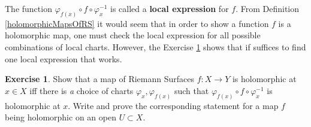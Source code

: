 \documentclass[12pt]{book}%
\theoremstyle{plain}
\theoremstyle{definition}
\newtheorem{exercise}{Exercise}
\theoremstyle{remark}
\def\to{\rightarrow}
\begin{document}
\begin{figure}
\label{schematicMapOfRS}
\end{figure}

The function $\varphi_{f(x)} \circ f \circ \varphi_x^{-1}$ is called a \textbf{local expression} for $f$. From Definition \ref{holomorphicMapsOfRS} it would seem that in order to show a function $f$ is a holomorphic map, one must check the local expression for all possible combinations of local charts. However, the Exercise \ref{oneLocalExpressionSuffices} shows that if suffices to find one local expression that works.

\begin{exercise}
\label{oneLocalExpressionSuffices}
Show that a map of Riemann Surfaces $f:X \to Y$ is holomorphic at $x\in X$ iff there is \textit{a} choice of charts $\varphi_x, \varphi_{f(x)}$ such that $\varphi_{f(x)} \circ f \circ \varphi_x^{-1}$ is holomorphic at $x$. Write and prove the corresponding statement for a map $f$ being holomorphic on an open $U\subset X$.
\end{exercise}
\end{document}
